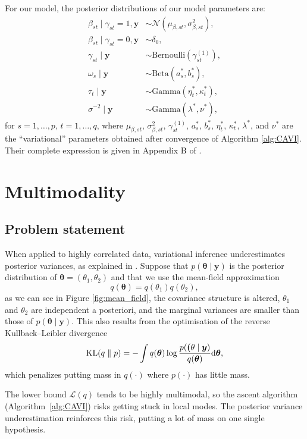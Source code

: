 \documentclass[a4paper, 11pt]{report}
\numberwithin{equation}{chapter}
\DeclareMathOperator*{\KL}{{\rm KL}}
\begin{document}
For our model, the posterior distributions of our model parameters are:
\begin{align*}
\beta_{st} \mid \gamma_{st} = 1, \boldsymbol{y} &\sim \mathcal{N}\left(\mu_{\beta, st},\sigma^2_{\beta, st}\right),\\
\beta_{st} \mid \gamma_{st} = 0, \boldsymbol{y} &\sim \delta_0,\\
\gamma_{st} \mid \boldsymbol{y} &\sim \text{Bernoulli}(\gamma_{st}^{(1)}),\\
\omega_s\mid\boldsymbol{y} &\sim \text{Beta}(a_s^*,b_s^*),\\
\tau_t\mid \boldsymbol{y} &\sim \text{Gamma}(\eta^*_t, \kappa^*_t),\\
\sigma^{-2} \mid \boldsymbol{y} &\sim \text{Gamma}(\lambda^*, \nu^*),
\end{align*}
for $s=1,\dots,p$, $t=1,\dots,q$, where $\mu_{\beta,st}$, $\sigma^2_{\beta,st}$, $\gamma_{st}^{(1)}$, $a_s^*$, $b_s^*$, $\eta_t^*$, $\kappa_t^*$, $\lambda^*$, and $\nu^*$ are the ``variational'' parameters obtained after convergence of Algorithm \ref{alg:CAVI}. Their complete expression is given in Appendix B of \citet{helen}.

\newpage
\chapter{Multimodality}
\section{Problem statement} \label{sec:pro_stat}
When applied to highly correlated data, variational inference underestimates posterior variances, as explained in \citet{varInf}. Suppose that $p(\boldsymbol{\theta} \mid \boldsymbol{y})$ is the posterior distribution of $\boldsymbol{\theta} = (\theta_1,\theta_2)$ and that we use the mean-field approximation $$
q(\boldsymbol{\theta}) = q(\theta_1)q(\theta_2),
$$
as we can see in Figure \ref{fig:mean_field}, the covariance structure is altered, $\theta_1$ and $\theta_2$ are independent a posteriori, and the marginal variances are smaller than those of $p(\boldsymbol{\theta} \mid \boldsymbol{y})$. This also results from the optimisation of the reverse Kullback--Leibler divergence
$$
\KL (q\parallel p) = - \int q(\boldsymbol{\theta})\log\frac{p(\boldsymbol(\theta\mid\boldsymbol{y})}{q(\boldsymbol{\theta})}\mathrm{d}\boldsymbol{\theta},
$$
which penalizes putting mass in $q(\cdot)$ where $p(\cdot)$ has little mass.

The lower bound $\mathcal{L}(q)$ tends to be highly multimodal, so the ascent algorithm (Algorithm~\ref{alg:CAVI}) risks getting stuck in local modes. The posterior variance underestimation reinforces this risk, putting a lot of mass on one single hypothesis.
\end{document}
